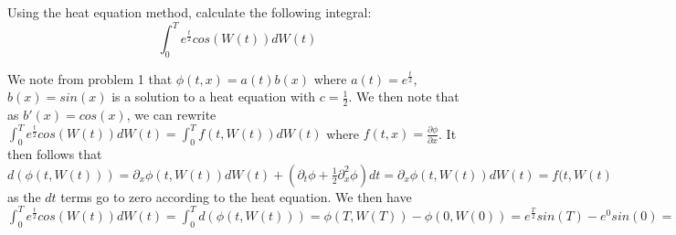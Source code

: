 \documentclass[12pt,twoside, letter]{exam}
\theoremstyle{definition}
\begin{document}
 Using the heat equation method, calculate the following integral:
\begin{equation*}
  \int^T_0 e^{\frac{t}{2}} cos(W(t))dW(t)
\end{equation*}

\begin{solution}
  We note from problem 1 that $\phi(t,x) = a(t)b(x)$ where $a(t) = e^{\frac{t}{2}}$, $b(x) = sin(x)$ is a solution to a heat equation
  with $c = \frac{1}{2}$. We then note
  that as $b'(x) = cos(x)$, we can rewrite $\int^T_0 e^{\frac{t}{2}} cos(W(t))dW(t) = \int^T_0 f(t, W(t)) dW(t)$ where
  $f(t,x) = \frac{\partial \phi}{\partial x}$. It then follows that $d(\phi(t,W(t))) = \partial_x \phi(t, W(t))dW(t) + (\partial_t \phi
  + \frac{1}{2} \partial^2_x \phi) dt = \partial_x \phi(t, W(t))dW(t) = f(t, W(t)$ as the $dt$ terms go to zero according to the heat equation.
  We then have $\int^T_0 e^{\frac{t}{2}} cos(W(t))dW(t) = \int^T_0 d(\phi(t,W(t))) = \phi(T, W(T)) - \phi(0, W(0)) =
  e^{\frac{T}{2}}sin(T) - e^{0}sin(0) = e^{\frac{T}{2}}sin(T)$
\end{solution}

\end{document}
